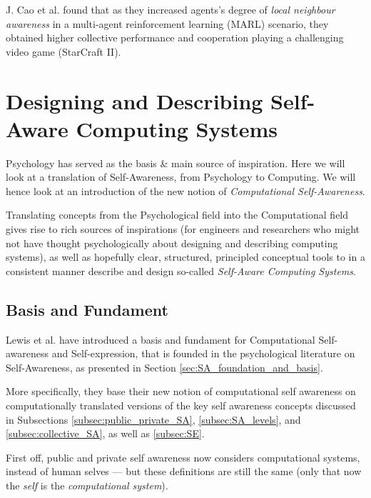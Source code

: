 			J. Cao et al. \cite{LINDA} found that as they increased agents's degree of \textit{local neighbour awareness} in a multi-agent reinforcement learning (MARL) scenario, they obtained higher collective performance and cooperation playing a challenging video game (StarCraft II).

			



\section{Designing and Describing Self-Aware Computing Systems}
\label{sec:design_describe_sa_comp_systems}

Psychology has served as the basis \& main source of inspiration. Here we will look at a translation of Self-Awareness, from Psychology to Computing. We will hence look at an introduction of the new notion of \textit{Computational Self-Awareness}.

Translating concepts from the Psychological field into the Computational field gives rise to rich sources of inspirations (for engineers and researchers who might not have thought psychologically about designing and describing computing systems), as well as hopefully clear, structured, principled conceptual tools to in a consistent manner describe and design so-called \textit{Self-Aware Computing Systems}.

	\subsection{Basis and Fundament}

	Lewis et al. \cite{sacs16_ch2} have introduced a basis and fundament for Computational Self-awareness and Self-expression, that is founded in the psychological literature on Self-Awareness, as presented in Section \ref{sec:SA_foundation_and_basis}.

	More specifically, they base their new notion of computational self awareness on computationally translated versions of the key self awareness concepts discussed in Subsections \ref{subsec:public_private_SA}, \ref{subsec:SA_levels}, and \ref{subsec:collective_SA}, as well as \ref{subsec:SE}.

	First off, public and private self awareness now considers computational systems, instead of human selves — but these definitions are still the same (only that now the \textit{self} is the \textit{computational system}).

